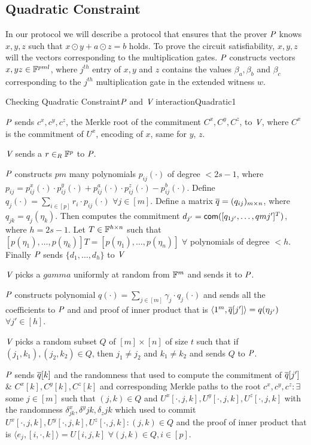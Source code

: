 \subsection{Quadratic Constraint} In our protocol we will describe a protocol that ensures that the prover $\P$ knows $x,y,z$ such that $x\odot y+a\odot z =b$ holds. To prove the circuit satisfiability, $x,y,z$ will the vectors corresponding to the multiplication gates. $\P$ constructs vectors $x, y z \in \bbF^{pml}$, where $j^{th}$ entry of $x, y$ and $z$ contains the values $\beta_a, \beta_b$ and $\beta_c$ corresponding to the $j^{th}$ multiplication gate in the extended witness $w$.

\begin{protocolbox}{Checking Quadratic Constraint}{$\P$ and $\V$ interaction}{Quadratic1}
	\begin{myitemize}
		\item $\P$ sends $c^x, c^y, c^z$, the Merkle root of the commitment $C^x, C^y, C^z$, to $\V$, where $C^x$ is the commitment of $U^x$, encoding of $x$, same for $y$, $z$.
		\item $\V$ sends a $r\in_R \bbF^{p}$ to $\P$.
		\item $\P$ constructs $pm$ many polynomials $p_{ij}(\cdot)$ of degree $<2s-1$, where $p_{ij}= p^x_{ij}(\cdot)\cdot p^y_{ij}(\cdot)+ p^a_{ij}(\cdot)\cdot p^z_{ij}(\cdot)-p^b_{ij}(\cdot)$. Define $q_j(\cdot) = \sum\limits_{i\in [p]} r_i\cdot p_{ij}(\cdot)$ $\forall j\in [m]$. Define a matrix $\oq=(q_{ij})_{m\times n}$, where $q_{jk}=q_j(\eta_k)$. Then computes the commitment $d_{j'} = \com([q_{1j'}, \ldots, q{mj'}]^T)$, where $h=2s-1$. Let $T\in \bbF^{h\times n}$ such that $[p(\eta_1), \ldots, p(\eta_k)]T= [p(\eta_1), \ldots, p(\eta_n)]$ $\forall$ polynomials of degree $<h$. Finally $\P$ sends $\{d_1,\ldots, d_h\}$ to $\V$ 
		\item $\V$ picks a $gamma$ uniformly at random from $\bbF^m$ and sends it to $\P$.
		\item $\P$ constructs polynomial $q(\cdot)=\sum\limits_{j\in [m]} \gamma_j\cdot q_j(\cdot)$ and sends all the coefficients to $\P$ and and proof of inner product that is $\langle  1^m , \oq[j'] \rangle = q(\eta_{j'})$ $\forall j'\in [h]$.
		\item $\V$ picks a random subset $Q$ of $[m]\times[n]$ of size $t$ such that if $(j_1,k_1),(j_2,k_2)\in Q$, then $j_1\neq j_2$ and $k_1\neq k_2$ and sends $Q$ to $\P$.	
		\item $\P$ sends $\oq[k]$ and the randomness that used to compute the commitment of $\oq[j']$ \& $C^x[k], C^y[k], C^z[k]$ and corresponding Merkle paths to the root $c^x, c^y, c^z : \exists$ some $j\in[m]$ such that $(j,k)\in Q$ and $U^x[\cdot,j,k], U^y[\cdot,j,k], U^z[\cdot,j,k]$ with the randomness $\delta^x_{jk}, \delta^y{jk}, \delta_z{jk}$ which used to commit $U^x[\cdot,j,k], U^y[\cdot,j,k], U^z[\cdot,j,k] : (j,k)\in Q$ and the proof of inner product that is $\langle e_j,[i,\cdot,k]\rangle=U[i,j,k]$ $\forall (j,k)\in Q, i\in [p]$.
	\end{myitemize}
\end{protocolbox}

